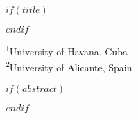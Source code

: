 $if(title)$
  \maketitle
$endif$

\begin{center}
\textsuperscript{1}University of Havana, Cuba\\
\textsuperscript{2}University of Alicante, Spain\\
\end{center}

\vspace{0.5cm}

$if(abstract)$
\begin{abstract}
$abstract$
\end{abstract}
$endif$

\newpage

